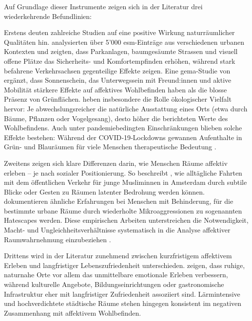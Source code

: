 Auf Grundlage dieser Instrumente zeigen sich in der Literatur drei wiederkehrende Befundlinien:

Erstens deuten zahlreiche Studien auf eine positive Wirkung naturräumlicher Qualitäten hin. \textcite{birenboimInfluenceUrbanEnvironments2018} analysierten über 5'000 \gls{esm}-Einträge aus verschiedenen urbanen Kontexten und zeigten, dass Parkanlagen, baumgesäumte Strassen und visuell offene Plätze das Sicherheits- und Komfortempfinden erhöhen, während stark befahrene Verkehrsachsen gegenteilige Effekte zeigen. Eine \gls{gema}-Studie von \textcite{mascherekMeadowsAsphaltRoad2025} ergänzt, dass Sonnenschein, das Unterwegssein mit Freund:innen und aktive Mobilität stärkere Effekte auf affektives Wohlbefinden haben als die blosse Präsenz von Grünflächen. \textcite{hammoudSmartphonebasedEcologicalMomentary2024} heben insbesondere die Rolle ökologischer Vielfalt hervor: Je abwechslungsreicher die natürliche Ausstattung eines Orts (etwa durch Bäume, Pflanzen oder Vogelgesang), desto höher die berichteten Werte des Wohlbefindens. Auch unter pandemiebedingten Einschränkungen blieben solche Effekte bestehen: Während der COVID‑19‑Lockdowns gewannen Aufenthalte in Grün- und Blauräumen für viele Menschen therapeutische Bedeutung \parencite{doughtyTherapeuticLandscapesCOVID192023}.

Zweitens zeigen sich klare Differenzen darin, wie Menschen Räume affektiv erleben – je nach sozialer Positionierung. So beschreibt \textcite{shakerSayingNothingSaying2021}, wie alltägliche Fahrten mit dem öffentlichen Verkehr für junge Muslim\genderstern innen in Amsterdam durch subtile Blicke oder Gesten zu Räumen latenter Bedrohung werden können. \textcite{hallHatescapeRelationalGeography2019} dokumentieren ähnliche Erfahrungen bei Menschen mit Behinderung, für die bestimmte urbane Räume durch wiederholte Mikroaggressionen zu sogenannten Hatescapes werden. Diese empirischen Arbeiten unterstreichen die Notwendigkeit, Macht- und Ungleichheitsverhältnisse systematisch in die Analyse affektiver Raumwahrnehmung einzubeziehen \parencite{hoSocialGeographyIII2024}.

Drittens wird in der Literatur zunehmend zwischen kurzfristigem affektivem Erleben und langfristiger Lebenszufriedenheit unterschieden. \textcite{chenPerceivedUrbanEnvironment2025} zeigen, dass ruhige, naturnahe Orte vor allem das unmittelbare emotionale Erleben verbessern, während kulturelle Angebote, Bildungseinrichtungen oder gastronomische Infrastruktur eher mit langfristiger Zufriedenheit assoziiert sind. Lärmintensive und hochverdichtete städtische Räume stehen hingegen konsistent im negativen Zusammenhang mit affektivem Wohlbefinden.

